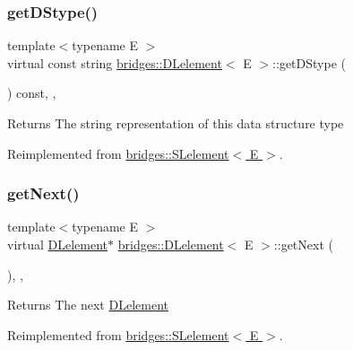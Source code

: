 \subsubsection{\texorpdfstring{get\+D\+Stype()}{getDStype()}}
{\footnotesize\ttfamily template$<$typename E $>$ \\
virtual const string \hyperlink{classbridges_1_1_d_lelement}{bridges\+::\+D\+Lelement}$<$ E $>$\+::get\+D\+Stype (\begin{DoxyParamCaption}{ }\end{DoxyParamCaption}) const\hspace{0.3cm}{\ttfamily [inline]}, {\ttfamily [override]}, {\ttfamily [virtual]}}

\begin{DoxyReturn}{Returns}
The string representation of this data structure type 
\end{DoxyReturn}


Reimplemented from \hyperlink{classbridges_1_1_s_lelement_a136330b3481a47b3edb429f323274655}{bridges\+::\+S\+Lelement$<$ E $>$}.

\hypertarget{classbridges_1_1_d_lelement_a0c713707d8c7d0a97fe4194ed6592ede}{}\label{classbridges_1_1_d_lelement_a0c713707d8c7d0a97fe4194ed6592ede} 
\subsubsection{\texorpdfstring{get\+Next()}{getNext()}\hspace{0.1cm}{\footnotesize\ttfamily [1/2]}}
{\footnotesize\ttfamily template$<$typename E $>$ \\
virtual \hyperlink{classbridges_1_1_d_lelement}{D\+Lelement}$\ast$ \hyperlink{classbridges_1_1_d_lelement}{bridges\+::\+D\+Lelement}$<$ E $>$\+::get\+Next (\begin{DoxyParamCaption}{ }\end{DoxyParamCaption})\hspace{0.3cm}{\ttfamily [inline]}, {\ttfamily [override]}, {\ttfamily [virtual]}}

\begin{DoxyReturn}{Returns}
The next \hyperlink{classbridges_1_1_d_lelement}{D\+Lelement} 
\end{DoxyReturn}


Reimplemented from \hyperlink{classbridges_1_1_s_lelement_a5bd74108a9aa49339378bf62cdbb19ca}{bridges\+::\+S\+Lelement$<$ E $>$}.

